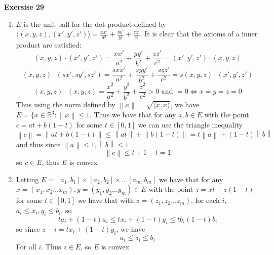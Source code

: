\documentclass[12pt]{article}
\newenvironment{ques}[1]{\textbf{Exersise #1}\vspace{1 mm}\\ }{\bigskip}
\theoremstyle{definition}
\newcommand{\R}{\mathbb R}
\newcommand{\norm}[1]{\left\lVert#1\right\rVert}
\begin{document}
\begin{ques}{29}
\begin{enumerate}
\item
	$E$ is the unit ball for the dot product defined by $\langle (x, y, z) , (x',
	y', z') \rangle = \frac{xx'}{a^2} +  \frac{yy'}{b^2} +  \frac{zz'}{c^2}$. It is
	clear that the axioms of a inner product are satisfied:
	$$(x, y, z) \cdot (x', y', z') = \frac{xx'}{a^2} +  \frac{yy'}{b^2} +
	\frac{zz'}{c^2} = (x', y', z') \cdot (x, y, z)$$
	$$(x, y, z) \cdot (sx', sy', sz') = \frac{sxx'}{a^2} +  \frac{syy'}{b^2} +
	\frac{szz'}{c^2} = s(x, y, z) \cdot (x', y', z') $$
	$$(x, y, z) \cdot (x, y, z) = \frac{x^2}{a^2} +  \frac{y^2}{b^2} +
	\frac{z^2}{c^2} > 0 \text{ and } = 0 \Leftrightarrow x = y= z = 0$$
	Thus using the norm defined by $\norm x  = \sqrt{\langle x, x\rangle}$, we
	have $E = \{x \in \R ^3: \norm x \leq 1$. Thus we have that for any $a, b
	\in E$ with the point $c = at + b(1-t)$ for some $t \in [0,1]$ we can use the
	triangle inequality
	$$\norm c = \norm {at +b(1-t)} \leq \norm {at} + \norm{b(1-t)} = t\norm a +
	(1-t)\norm b$$
	and thus since $\norm a \leq 1, \norm b \leq 1$
	$$\norm c\leq t + 1-t = 1$$
	so $c \in E$, thus $E$ is convex
	
\item
	Letting $E = [a_1,b_1] \times [a_2,b_2] \times \dots [a_m, b_m]$ we have that
	for any $x = (x_1, x_2 \dots x_m), y = (y_1, y_2 \dots y_m) \in E$ with the
	point $z = xt + z(1-t)$ for some $t \in [0,1]$ we have that with $z = (z_1,
	z_2 \dots z_m)$, for each $i$, $a_i \leq x_i, y_i \leq b_i$, so 
	$$ta_i + (1-t)a_i \leq tx_i + (1-t)y_i \leq tb_i (1-t)b_i$$
	so since $z-i = tx_i + (1-t)y_i$, we have
	$$a_i \leq z_i \leq b_i$$
	For all $i$. Thus $z \in E$, so $E$ is convex

\end{enumerate}
\end{ques}
\end{document}
